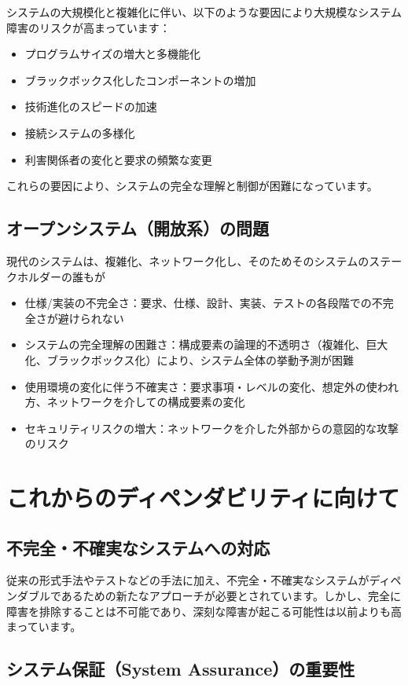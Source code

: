 システムの大規模化と複雑化に伴い、以下のような要因により大規模なシステム障害のリスクが高まっています：
\begin{itemize}
\item プログラムサイズの増大と多機能化
\item ブラックボックス化したコンポーネントの増加
\item 技術進化のスピードの加速
\item 接続システムの多様化
\item 利害関係者の変化と要求の頻繁な変更
\end{itemize}

これらの要因により、システムの完全な理解と制御が困難になっています。

\subsection{オープンシステム（開放系）の問題}

現代のシステムは、複雑化、ネットワーク化し、そのためそのシステムのステークホルダーの誰もが
\begin{itemize}
\item 仕様/実装の不完全さ：要求、仕様、設計、実装、テストの各段階での不完全さが避けられない
\item システムの完全理解の困難さ：構成要素の論理的不透明さ（複雑化、巨大化、ブラックボックス化）により、システム全体の挙動予測が困難
\item 使用環境の変化に伴う不確実さ：要求事項・レベルの変化、想定外の使われ方、ネットワークを介しての構成要素の変化
\item セキュリティリスクの増大：ネットワークを介した外部からの意図的な攻撃のリスク
\end{itemize}

\section{これからのディペンダビリティに向けて}

\subsection{不完全・不確実なシステムへの対応}

従来の形式手法やテストなどの手法に加え、不完全・不確実なシステムがディペンダブルであるための新たなアプローチが必要とされています。しかし、完全に障害を排除することは不可能であり、深刻な障害が起こる可能性は以前よりも高まっています。

\subsection{システム保証（System Assurance）の重要性}

